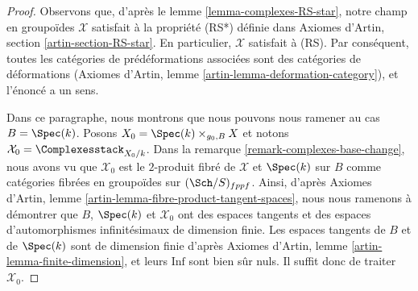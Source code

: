 \begin{proof}
Observons que, d'après le lemme \ref{lemma-complexes-RS-star}, notre champ en
groupoïdes $\mathcal{X}$ satisfait à la propriété (RS*) définie dans
Axiomes d'Artin, section \ref{artin-section-RS-star}.
En particulier, $\mathcal{X}$ satisfait à (RS).
Par conséquent, toutes les catégories de prédéformations associées sont des
catégories de déformations
(Axiomes d'Artin, lemme \ref{artin-lemma-deformation-category}),
et l'énoncé a un sens.

\medskip\noindent
Dans ce paragraphe, nous montrons que nous pouvons nous ramener au cas
$B = \Spec(k)$. Posons $X_0 = \Spec(k) \times_{g_0, B} X$ et notons
$\mathcal{X}_0 = \Complexesstack_{X_0/k}$. Dans la remarque
\ref{remark-complexes-base-change}, nous avons vu que $\mathcal{X}_0$ est le
$2$-produit fibré de $\mathcal{X}$ et $\Spec(k)$ sur $B$ comme catégories
fibrées en groupoïdes sur $(\Sch/S)_{fppf}$. Ainsi, d'après
Axiomes d'Artin, lemme \ref{artin-lemma-fibre-product-tangent-spaces},
nous nous ramenons à démontrer que $B$, $\Spec(k)$ et $\mathcal{X}_0$ ont des
espaces tangents et des espaces d'automorphismes infinitésimaux de dimension
finie. Les espaces tangents de $B$ et de $\Spec(k)$ sont de dimension finie
d'après Axiomes d'Artin, lemme \ref{artin-lemma-finite-dimension}, et leurs
$\text{Inf}$ sont bien sûr nuls.
Il suffit donc de traiter $\mathcal{X}_0$.


\end{proof}
